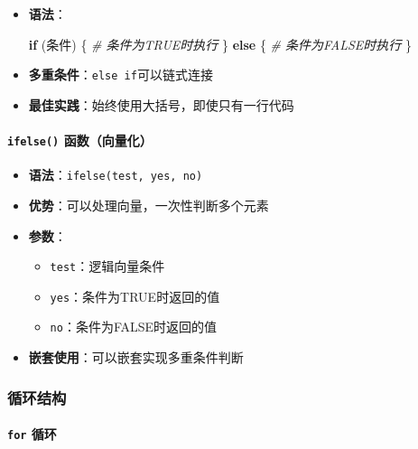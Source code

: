 \documentclass[
]{book}
\newenvironment{Shaded}{\begin{snugshade}}{\end{snugshade}}
\newcommand{\CommentTok}[1]{\textcolor[rgb]{0.56,0.35,0.01}{\textit{#1}}}
\newcommand{\ControlFlowTok}[1]{\textcolor[rgb]{0.13,0.29,0.53}{\textbf{#1}}}
\newcommand{\NormalTok}[1]{#1}
\providecommand{\tightlist}{%
  \setlength{\itemsep}{0pt}\setlength{\parskip}{0pt}}
\begin{document}
\begin{itemize}
\item
  \textbf{语法}：

\begin{Shaded}
\begin{Highlighting}[]
\ControlFlowTok{if}\NormalTok{ (条件) \{}
  \CommentTok{\# 条件为TRUE时执行}
\NormalTok{\} }\ControlFlowTok{else}\NormalTok{ \{}
  \CommentTok{\# 条件为FALSE时执行}
\NormalTok{\}}
\end{Highlighting}
\end{Shaded}
\item
  \textbf{多重条件}：\texttt{else\ if}可以链式连接
\item
  \textbf{最佳实践}：始终使用大括号，即使只有一行代码
\end{itemize}

\hypertarget{ifelse-ux51fdux6570ux5411ux91cfux5316}{%
\paragraph{\texorpdfstring{\texttt{ifelse()} 函数（向量化）}{ifelse() 函数（向量化）}}\label{ifelse-ux51fdux6570ux5411ux91cfux5316}}

\begin{itemize}
\tightlist
\item
  \textbf{语法}：\texttt{ifelse(test,\ yes,\ no)}
\item
  \textbf{优势}：可以处理向量，一次性判断多个元素
\item
  \textbf{参数}：

  \begin{itemize}
  \tightlist
  \item
    \texttt{test}：逻辑向量条件
  \item
    \texttt{yes}：条件为TRUE时返回的值
  \item
    \texttt{no}：条件为FALSE时返回的值
  \end{itemize}
\item
  \textbf{嵌套使用}：可以嵌套实现多重条件判断
\end{itemize}

\hypertarget{ux5faaux73afux7ed3ux6784}{%
\subsubsection{循环结构}\label{ux5faaux73afux7ed3ux6784}}

\hypertarget{for-ux5faaux73af}{%
\paragraph{\texorpdfstring{\texttt{for} 循环}{for 循环}}\label{for-ux5faaux73af}}
\end{document}
